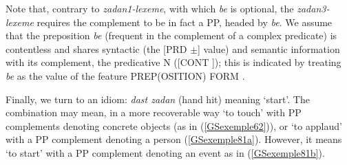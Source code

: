 \documentclass[output=paper]{langsci/langscibook}
\begin{document}
{\begin{exe}
\end{exe}

Note that, contrary to \textit{zadan1-lexeme}, with which \textit{be} is optional, the \textit{zadan3-lexeme} requires the complement to be in fact a PP, headed by \textit{be}. We assume that the preposition \textit{be} (frequent in the complement of a complex predicate) is contentless and shares syntactic (the [PRD $\pm$] value) and semantic information with its complement, the predicative N ([CONT ]); this is indicated by treating \textit{be} as the value of the feature PREP(OSITION) FORM \citep[chap. 3]{pollard1987information}.  

Finally, we turn to an idiom: \textit{dast zadan} (hand hit) meaning `start'. The combination may mean, in a more recoverable way `to touch' with PP complements denoting concrete objects (as in (\ref{GSexemple62})), or `to applaud' with a PP complement denoting a person (\ref{GSexemple81a}). However, it means `to start' with a PP complement denoting an event as in (\ref{GSexemple81b}).

\begin{exe}
	\ex \label{GSexemple81} 
	\begin{xlist}
        \label{GSexemple81a}
		

\end{xlist}
\end{exe}}
\end{document}
